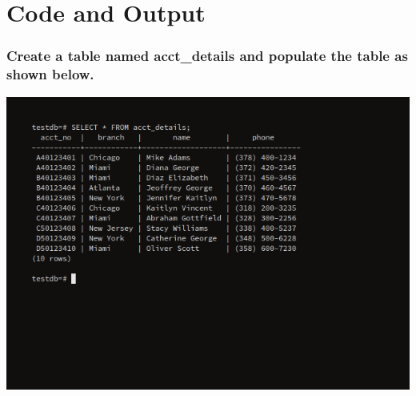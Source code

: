 \section{{Code and Output}}

\subsubsection{Create a table named acct\_details and populate the table as shown below.}

\newline
\includegraphics[width=\linewidth]{../Images/Strings/1.png}


